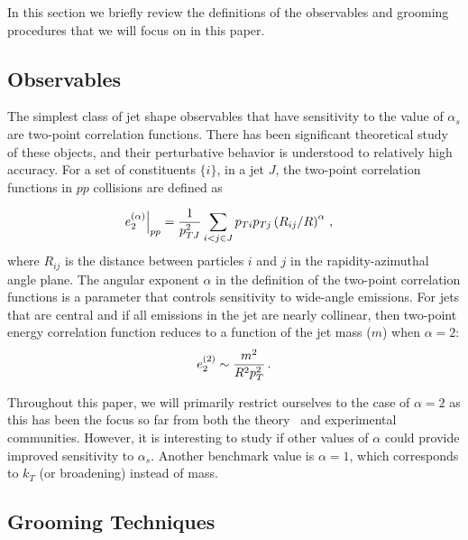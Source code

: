 
In this section we briefly review the definitions of the observables and grooming procedures that we will focus on in this paper.


\subsection{Observables}\label{sec:shape_def}


The simplest class of jet shape observables that have sensitivity to the value of $\alpha_s$ are two-point correlation functions. There has been significant theoretical study of these objects, and their perturbative behavior is understood to relatively high accuracy. For a set of constituents $\{i\}$, in a jet $J$, the two-point correlation functions in $pp$ collisions are defined as

\begin{align}\label{eq:ppe2}
\left.e_{2}^{(\alpha)}\right|_{pp}&=\frac{1}{p_{TJ}^2}\sum_{i<j\in J} p_{Ti} p_{Tj}\left(R_{ij}/R\right)^\alpha\,, 
\end{align}
where $R_{ij}$ is the distance between particles $i$
and $j$ in the rapidity-azimuthal angle plane.   The angular exponent $\alpha$ in the definition of the two-point correlation functions is a parameter that controls sensitivity to wide-angle emissions. For jets that are central and if all emissions in the jet are nearly collinear, then two-point energy correlation function reduces to a function of the jet mass ($m$) when $\alpha=2$:
\begin{equation}
e_{2}^{(2)} \sim \frac{m^2}{R^2p_{T}^2}\,.
\end{equation} 

Throughout this paper, we will primarily restrict ourselves to the
case of $\alpha=2$ as this has been the focus so far from both the theory~\cite{Frye:2016okc,Frye:2016aiz,Marzani:2017kqd,Marzani:2017mva} and experimental~\cite{Aaboud:2017qwh,CMS-PAS-SMP-16-010} communities.  However, it is interesting
to study if other values of $\alpha$ could provide improved
sensitivity to $\alpha_s$. Another benchmark value is $\alpha=1$,
which corresponds to $k_T$ (or broadening) instead of mass.


\subsection{Grooming Techniques}\label{sec:groom_tech}

